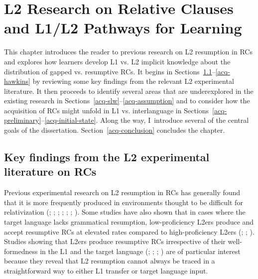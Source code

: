 
\chapter{L2 Research on Relative Clauses and L1/L2 Pathways for Learning}\label{ch-acquisition}


This chapter introduces the reader to previous research on L2 resumption in RCs and explores how learners develop L1 vs. L2 implicit knowledge about the distribution of gapped vs. resumptive RCs. It begins in Sections~\ref{acq-findings}--\ref{acq-hawkins} by reviewing some key findings from the relevant L2 experimental literature. It then proceeds to identify several areas that are underexplored in the existing research in Sections~\ref{acq-slw}--\ref{acq-assumption} and to consider how the acquisition of RCs might unfold in L1 vs. interlanguage in Sections~\ref{acq-preliminary}--\ref{acq-initial-state}. Along the way, I~introduce several of the central goals of the dissertation. Section~\ref{acq-conclusion} concludes the chapter.

\section{Key findings from the L2 experimental literature on RCs}\label{acq-findings}

Previous experimental research on L2 resumption in RCs has generally found that it is more frequently produced in environments thought to be difficult for relativization (\cite{algady2013}; \cite{eckman.etal1988}; \cite{gass1979}; \cite{hyltenstam1984,hyltenstam1990}; \cite{kim2013}; \cite{maghrabi1997}; \cite{pavesi1986}). Some studies have also shown that in cases where the target language lacks grammatical resumption, low-proficiency L2ers produce and accept resumptive RCs at elevated rates compared to high-proficiency L2ers (\cite{hawkins.chan1997}; \cite{kim2013}; \cite{maghrabi1997}). Studies showing that L2ers produce resumptive RCs irrespective of their well-formedness in the L1 and the target language (\cite{gass1979}; \cite{hyltenstam1984,hyltenstam1990}; \cite{maghrabi1997}; \cite{pavesi1986}) are of particular interest because they reveal that L2 resumption cannot always be traced in a straightforward way to either L1 transfer or target language input.

